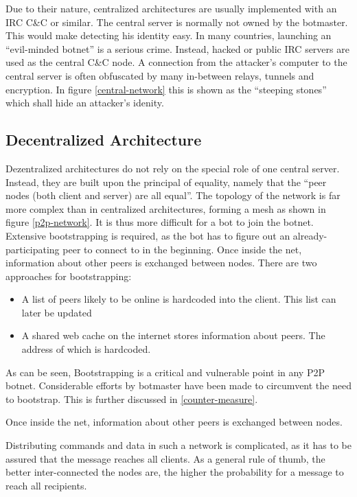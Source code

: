 \documentclass{llncs}
\begin{document}
Due to their nature, centralized architectures are usually implemented
with an IRC C\&C or similar\cite{cooke2005zombie}. The central server
is normally not owned by the botmaster. This would make detecting his
identity easy. In many countries, launching an ``evil-minded botnet''
is a serious crime. Instead, hacked or public IRC servers are used as
the central C\&C node. A connection from the attacker's computer to
the central server is often obfuscated by many in-between relays,
tunnels and encryption. In figure
\ref{central-network} this is shown as the ``steeping stones'' which
shall hide an attacker's idenity.

\subsection{Decentralized Architecture}
\label{decent}
Dezentralized architectures do not rely on the special role of one
central server. Instead, they are built upon the principal of
equality, namely that the ``peer nodes (both client and server) are
all equal''\cite{steggink2007detection}. The topology of the network
is far more complex than in centralized architectures, forming a mesh
as shown in figure \ref{p2p-network}. It is thus more difficult for a
bot to join the botnet. Extensive bootstrapping is required, as the
bot has to figure out an already-participating peer to connect to in the
beginning. Once inside the net, information about other peers is
exchanged between nodes. There are two approaches for bootstrapping\cite{wang2009systematic}:
\begin{itemize}
\item A list of peers likely to be online is hardcoded into the client. This list can later be updated
\item A shared web cache on the internet stores information about
  peers. The address of which is hardcoded.
\end{itemize}

As can be seen, Bootstrapping is a critical and vulnerable point in
any P2P botnet. Considerable efforts by botmaster have been made to
circumvent the need to bootstrap\cite{td1sc}. This is further
discussed in \ref{counter-measure}.

Once inside the net, information about other peers is
exchanged between nodes.

Distributing commands and data in such a network is complicated, as it
has to be assured that the message reaches all clients. As a general
rule of thumb, the better inter-connected the nodes are, the higher
the probability for a message to reach all recipients.
\end{document}
